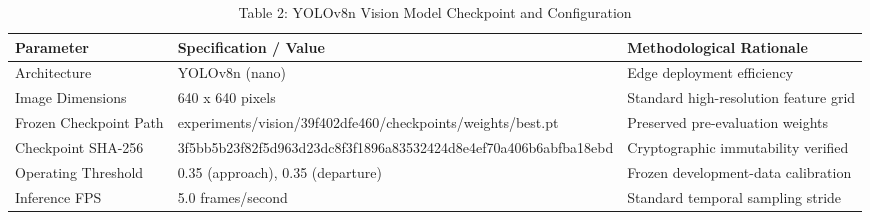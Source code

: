 \begin{table}[t]
\centering
\caption{Table 2: YOLOv8n Vision Model Checkpoint and Configuration}
\label{tab:table02_vision_model_config}
\begin{tabular}{lll}
\hline
Parameter & Specification / Value & Methodological Rationale \\
\hline
Architecture & YOLOv8n (nano) & Edge deployment efficiency \\
Image Dimensions & 640 x 640 pixels & Standard high-resolution feature grid \\
Frozen Checkpoint Path & experiments/vision/39f402dfe460/checkpoints/weights/best.pt & Preserved pre-evaluation weights \\
Checkpoint SHA-256 & 3f5bb5b23f82f5d963d23dc8f3f1896a83532424d8e4ef70a406b6abfba18ebd & Cryptographic immutability verified \\
Operating Threshold & 0.35 (approach), 0.35 (departure) & Frozen development-data calibration \\
Inference FPS & 5.0 frames/second & Standard temporal sampling stride \\
\hline
\end{tabular}
\end{table}
